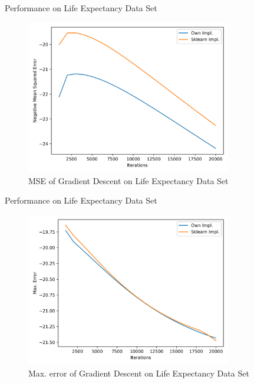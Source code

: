 \documentclass[10pt]{beamer}
\begin{document}
    \begin{frame}{Performance on Life Expectancy Data Set}
        \begin{figure}[h!]
            \centering
            \includegraphics[width=0.8\textwidth]{exercise_2/presentation/figures/le_gradient-descent_scores_mean_sq_err.png}
            \caption{MSE of Gradient Descent on Life Expectancy Data Set}
            \label{fig:Grad_LE_MSE}
       \end{figure}    
    \end{frame}
    
    \begin{frame}{Performance on Life Expectancy Data Set}
          \begin{figure}[h!]
            \centering
            \includegraphics[width=0.8\textwidth]{exercise_2/presentation/figures/le_gradient-descent_scores_max_error.png}
            \caption{Max. error of Gradient Descent on Life Expectancy Data Set}
            \label{fig:Grad_LE_max-error}
       \end{figure}
    \end{frame}
    
\end{document}
